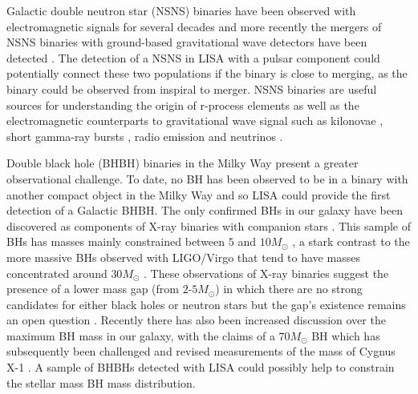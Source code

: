  

Galactic double neutron star (NSNS) binaries have been observed with electromagnetic signals for several decades \citep[e.g.][]{Hulse+1975, Tauris+2017,Vigna-Gomez+2018} and more recently the mergers of NSNS binaries with ground-based gravitational wave detectors have been detected \citep[e.g.][]{Abbott+2017_NSNS}. The detection of a NSNS in LISA with a pulsar component could potentially connect these two populations if the binary is close to merging, as the binary could be observed from inspiral to merger. NSNS binaries are useful sources for understanding the origin of r-process elements \citep[e.g.][]{Eichler+1989} as well as the electromagnetic counterparts to gravitational wave signal such as kilonovae \citep[e.g.][]{Metzger+2017}, short gamma-ray bursts \citep[e.g.][]{Gompertz+2020}, radio emission \citep[e.g.][]{Hotokezaka+2016} and neutrinos \citep[e.g.][]{Kyutoku+2018}.

Double black hole (BHBH) binaries in the Milky Way present a greater observational challenge. To date, no BH has been observed to be in a binary with another compact object in the Milky Way and so LISA could provide the first detection of a Galactic BHBH. The only confirmed BHs in our galaxy have been discovered as components of X-ray binaries with companion stars \citep[e.g.][]{Bolton+1972,Webster+1972}. This sample of BHs has masses mainly constrained between $5$ and $10 \unit{M_\odot}$ \citep{Corral-Santana+2016}, a stark contrast to the more massive BHs observed with LIGO/Virgo that tend to have masses concentrated around $30 \unit{M_{\odot}}$ \citep{Abbott+2020_GWTC2}. These observations of X-ray binaries suggest the presence of a lower mass gap (from $2$-$5 \unit{M_{\odot}}$) in which there are no strong candidates for either black holes or neutron stars \citep{Ozel+2010,Farr+2011} but the gap's existence remains an open question \citep[e.g.][]{Kreidberg+2012, Mandel+2020}. Recently there has also been increased discussion over the maximum BH mass in our galaxy, with the claims of a $70 \unit{M_{\odot}}$ BH \citep{Liu+2019} which has subsequently been challenged \citep{El-Badry+2020, Abdul-Masih+2020, Shenar+2020,Eldridge+2020} and revised measurements of the mass of Cygnus X-1 \citep{Miller-Jones+2021}. A sample of BHBHs detected with LISA could possibly help to constrain the stellar mass BH mass distribution.

